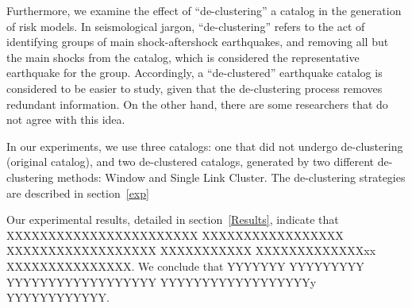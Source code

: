 Furthermore, we examine the effect of ``de-clustering'' a catalog in
the generation of risk models. In seismological jargon,
``de-clustering'' refers to the act of identifying groups of
main shock-aftershock earthquakes, and removing all but the main shocks
from the catalog, which is considered the representative earthquake
for the group. Accordingly, a ``de-clustered'' earthquake catalog is
considered to be easier to study, given that the de-clustering process
removes redundant information. On the other hand, there are some
researchers that do not agree with this idea.

In our experiments, we use three catalogs: one that did not undergo
de-clustering (original catalog), and two de-clustered catalogs,
generated by two different de-clustering methods: Window and Single
Link Cluster. The de-clustering strategies are described in
section~\ref{exp}

Our experimental results, detailed in section~\ref{Results}, indicate
that XXXXXXXXXXXXXXXXXXXXXXX XXXXXXXXXXXXXXXXX XXXXXXXXXXXXXXXXXX
XXXXXXXXXXX XXXXXXXXXXXXXxx XXXXXXXXXXXXXXX. We conclude that YYYYYYY
YYYYYYYYY YYYYYYYYYYYYYYYYYY YYYYYYYYYYYYYYYYYYy YYYYYYYYYYYY.


